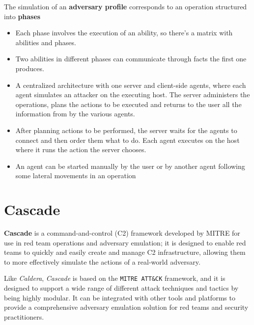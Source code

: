 The simulation of an \textbf{adversary profile} corresponds to an operation
structured into \textbf{phases}
\begin{itemize}
   \item Each phase involves the execution of an ability,
   so there's a matrix with abilities and phases.
   \item Two abilities in different phases can communicate through facts the
   first one produces. 
   \item A centralized architecture with one server and client-side agents,
   where each agent simulates an attacker on the executing host.
   The server
   administers the operations, plans the actions to be executed and
   returns to the user all the information from by the various agents.
   \item After planning actions to be performed, the server waits for the
   agents to connect and then order them what to do. Each agent
   executes on the host where it runs the action the server chooses.
   \item An agent can be started manually by the user or by another agent
   following some lateral movements in an operation
\end{itemize}


\section{Cascade}
\textbf{Cascade} is a command-and-control (C2) framework developed by MITRE for
use in red team operations and adversary emulation;
it is designed to enable red teams to quickly and
easily create and manage C2 infrastructure, allowing them to
more effectively simulate the actions of a real-world adversary.

Like \textit{Caldera}, \textit{Cascade} is based on the \texttt{MITRE ATT\&CK}
framework, and it is designed to support a wide range of different attack techniques and tactics by being highly modular.
It can be integrated with other tools and platforms to provide a
comprehensive adversary emulation solution for red teams and security practitioners.